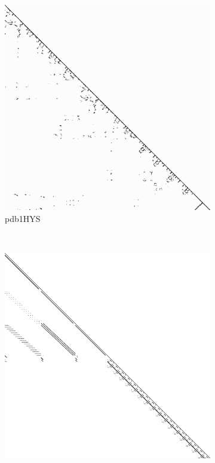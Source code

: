 \begin{figure}
\begin{multicols}{3}
\begin{subfigure}{\linewidth}
\includegraphics[width=\linewidth]{images/pdb1HYS}
\caption{pdb1HYS}
\end{subfigure}~%
\begin{subfigure}{\linewidth}
\includegraphics[width=\linewidth]{images/consph}

\end{subfigure}
\end{multicols}
\end{figure}
